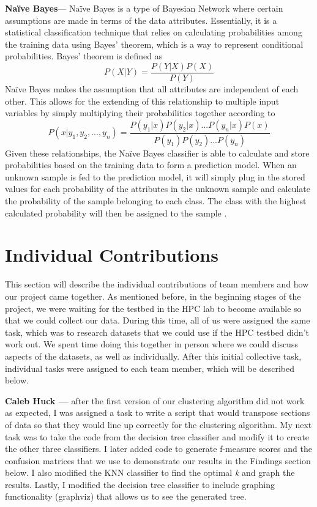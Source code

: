 \documentclass[letterpaper, 10 pt, conference]{ieeeconf}  %
\begin{document}
\textbf{Na\"{i}ve Bayes}--- Na\"{i}ve Bayes is a type of Bayesian Network where certain assumptions are made in terms of the data attributes. Essentially, it is a statistical classification technique that relies on calculating probabilities among the training data using Bayes' theorem, which is a way to represent conditional probabilities. Bayes' theorem is defined as
\begin{equation}
    P(X|Y)=\dfrac{P(Y|X)P(X)}{P(Y)}
\end{equation}
Na\"{i}ve Bayes makes the assumption that all attributes are independent of each other. This allows for the extending of this relationship to multiple input variables by simply multiplying their probabilities together according to
\begin{equation}
    P(x|y_1, y_2,...,y_n)=\dfrac{P(y_1|x)P(y_2|x)...P(y_n|x)P(x)}{P(y_1)P(y_2)...P(y_n)}
\end{equation}
Given these relationships, the Na\"{i}ve Bayes classifier is able to calculate and store probabilities based on the training data to form a prediction model. When an unknown sample is fed to the prediction model, it will simply plug in the stored values for each probability of the attributes in the unknown sample and calculate the probability of the sample belonging to each class. The class with the highest calculated probability will then be assigned to the sample \cite{nikam2015comparative}.  


\section{Individual Contributions}
This section will describe the individual contributions of team members and how our project came together. As mentioned before, in the beginning stages of the project, we were waiting for the testbed in the HPC lab to become available so that we could collect our data. During this time, all of us were assigned the same task, which was to research datasets that we could use if the HPC testbed didn't work out. We spent time doing this together in person where we could discuss aspects of the datasets, as well as individually. After this initial collective task, individual tasks were assigned to each team member, which will be described below.

\textbf{Caleb Huck ---} after the first version of our clustering algorithm did not work as expected, I was assigned a task to write a script that would transpose sections of data so that they would line up correctly for the clustering algorithm. My next task was to take the code from the decision tree classifier and modify it to create the other three classifiers. I later added code to generate f-measure scores and the confusion matrices that we use to demonstrate our results in the Findings section below. I also modified the KNN classifier to find the optimal \textit{k} and graph the results. Lastly, I modified the decision tree classifier to include graphing functionality (graphviz) that allows us to see the generated tree.
\end{document}
